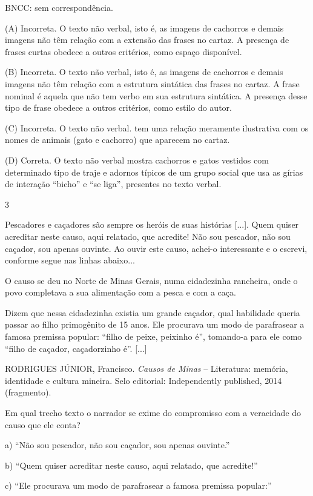 BNCC: sem correspondência.

(A) Incorreta. O texto não verbal, isto é, as imagens de cachorros e
demais imagens não têm relação com a extensão das frases no cartaz. A
presença de frases curtas obedece a outros critérios, como espaço
disponível.

(B) Incorreta. O texto não verbal, isto é, as imagens de cachorros e
demais imagens não têm relação com a estrutura sintática das frases no
cartaz. A frase nominal é aquela que não tem verbo em sua estrutura
sintática. A presença desse tipo de frase obedece a outros critérios,
como estilo do autor.

(C) Incorreta. O texto não verbal. tem uma relação meramente ilustrativa
com os nomes de animais (gato e cachorro) que aparecem no cartaz.

(D) Correta. O texto não verbal mostra cachorros e gatos vestidos com
determinado tipo de traje e adornos típicos de um grupo social que usa
as gírias de interação ``bicho'' e ``se liga'', presentes no texto
verbal.

\num{3}

Pescadores e caçadores são sempre os heróis de suas histórias {[}...{]}.
Quem quiser acreditar neste causo, aqui relatado, que acredite! Não sou
pescador, não sou caçador, sou apenas ouvinte. Ao ouvir este causo,
achei-o interessante e o escrevi, conforme segue nas linhas abaixo...

O causo se deu no Norte de Minas Gerais, numa cidadezinha rancheira,
onde o povo completava a sua alimentação com a pesca e com a caça.

Dizem que nessa cidadezinha existia um grande caçador, qual habilidade
queria passar ao filho primogênito de 15 anos. Ele procurava um modo de
parafrasear a famosa premissa popular: ``filho de peixe, peixinho é'',
tomando-a para ele como ``filho de caçador, caçadorzinho é''. {[}...{]}

RODRIGUES JÚNIOR, Francisco. \emph{Causos de Minas} -- Literatura:
memória, identidade e cultura mineira. Selo editorial: Independently
published, 2014 (fragmento).

Em qual trecho texto o narrador se exime do compromisso com a veracidade
do causo que ele conta?

a) ``Não sou pescador, não sou caçador, sou apenas ouvinte.''

b) ``Quem quiser acreditar neste causo, aqui relatado, que acredite!''

c) ``Ele procurava um modo de parafrasear a famosa premissa popular:''

